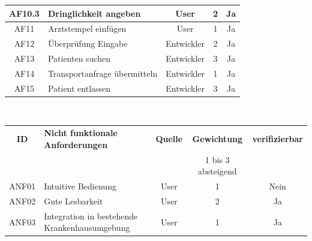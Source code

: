 \documentclass[a4paper, ngerman, 12pt]{scrartcl}
\begin{document}
\begin{adjustbox}{max width=\textwidth}
\begin{tabular}{|c|l|c|c|c|}
\hline
AF10.3&Dringlichkeit angeben
						&User		&2		&Ja\\
\hline
AF11&Arztstempel einfügen
						&User		&1		&Ja\\
\hline
AF12&Überprüfung Eingabe
						&Entwickler		&2		&Ja\\
\hline
AF13&Patienten suchen
						&Entwickler		&3		&Ja\\
\hline
AF14&Transportanfrage übermitteln
						&Entwickler		&1		&Ja\\
\hline
AF15&Patient entlassen
						&Entwickler		&3		&Ja\\
\hline
\end{tabular}
\end{adjustbox}\\[1em]
 \begin{adjustbox}{max width=\textwidth}
\begin{tabular}{|c|l|c|c|c|}
\hline
\rowcolor{lightgray}\textbf{ID}	&\textbf{Nicht funktionale Anforderungen}	&\textbf{Quelle}&\textbf{Gewichtung}	&\textbf{verifizierbar}\\
\rowcolor{lightgray}	&						&		&\scriptsize{1 bis 3 absteigend}			&\\
\hline
ANF01&Intuitive Bedienung						&User		&1		&Nein\\
\hline
ANF02&Gute Lesbarkeit						&User		&2		&Ja\\
\hline
ANF03&Integration in bestehende Krankenhausumgebung
						&User		&1		&Ja\\
						\hline
\end{tabular}
\end{adjustbox}
\end{document}

